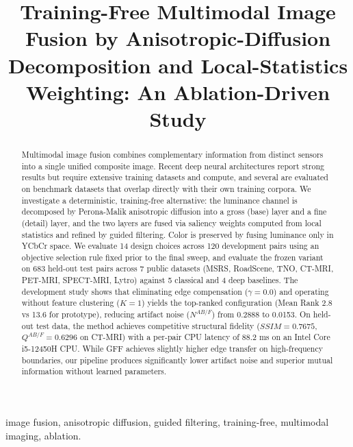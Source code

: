 \documentclass[conference]{IEEEtran}
\begin{document}
\title{Training-Free Multimodal Image Fusion by Anisotropic-Diffusion Decomposition and Local-Statistics Weighting: An Ablation-Driven Study}

\author{
}

\maketitle

\begin{abstract}
Multimodal image fusion combines complementary information from distinct sensors into a single unified composite image. Recent deep neural architectures report strong results but require extensive training datasets and compute, and several are evaluated on benchmark datasets that overlap directly with their own training corpora. We investigate a deterministic, training-free alternative: the luminance channel is decomposed by Perona-Malik anisotropic diffusion into a gross (base) layer and a fine (detail) layer, and the two layers are fused via saliency weights computed from local statistics and refined by guided filtering. Color is preserved by fusing luminance only in YCbCr space. We evaluate 14 design choices across 120 development pairs using an objective selection rule fixed prior to the final sweep, and evaluate the frozen variant on 683 held-out test pairs across 7 public datasets (MSRS, RoadScene, TNO, CT-MRI, PET-MRI, SPECT-MRI, Lytro) against 5 classical and 4 deep baselines. The development study shows that eliminating edge compensation ($\gamma=0.0$) and operating without feature clustering ($K=1$) yields the top-ranked configuration (Mean Rank 2.8 vs 13.6 for prototype), reducing artifact noise ($N^{AB/F}$) from 0.2888 to 0.0153. On held-out test data, the method achieves competitive structural fidelity ($SSIM = 0.7675$, $Q^{AB/F} = 0.6296$ on CT-MRI) with a per-pair CPU latency of 88.2 ms on an Intel Core i5-12450H CPU. While GFF achieves slightly higher edge transfer on high-frequency boundaries, our pipeline produces significantly lower artifact noise and superior mutual information without learned parameters.
\end{abstract}

\begin{IEEEkeywords}
image fusion, anisotropic diffusion, guided filtering, training-free, multimodal imaging, ablation.
\end{IEEEkeywords}
\end{document}
